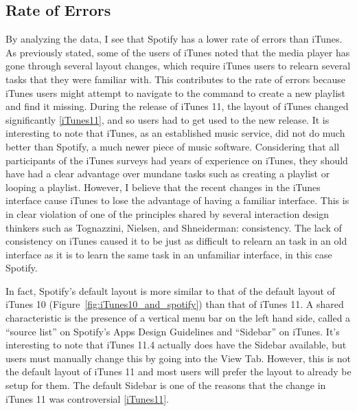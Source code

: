 \documentclass[11pt]{article}
\begin{document}
\subsection{Rate of Errors}
By analyzing the data, I see that Spotify has a lower rate of errors than iTunes. As previously stated, some of the users of iTunes noted that the media player has gone through several layout changes, which require iTunes users to relearn several tasks that they were familiar with. This contributes to the rate of errors because iTunes users might attempt to navigate to the command to create a new playlist and find it missing.
During the release of iTunes 11, the layout of iTunes changed significantly \ref{iTunes11}, and so users had to get used to the new release. It is interesting to note that iTunes, as an established music service, did not do much better than Spotify, a much newer piece of music software. Considering that all participants of the iTunes surveys had years of experience on iTunes, they should have had a clear advantage over mundane tasks such as creating a playlist or looping a playlist. However, I believe that the recent changes in the iTunes interface cause iTunes to lose the advantage of having a familiar interface. This is in clear violation of one of the principles shared by several interaction design thinkers such as Tognazzini, Nielsen, and Shneiderman: consistency. The lack of consistency on iTunes caused it to be just as difficult to relearn an task in an old interface as it is to learn the same task in an unfamiliar interface, in this case Spotify.

In fact, Spotify's default layout is more similar to that of the default layout of iTunes 10 (Figure~\ref{fig:iTunes10_and_spotify}) than that of iTunes 11. A shared characteristic is the presence of a vertical menu bar on the left hand side, called a ``source list'' on Spotify's Apps Design Guidelines and ``Sidebar'' on iTunes. It's interesting to note that iTunes 11.4 actually does have the Sidebar available, but users must manually change this by going into the View Tab. However, this is not the default layout of iTunes 11 and most users will prefer the layout to already be setup for them. The default Sidebar is one of the reasons that the change in iTunes 11 was controversial \ref{iTunes11}.
\end{document}
